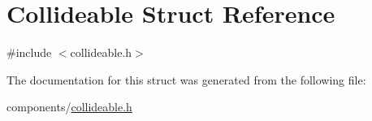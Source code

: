 \hypertarget{structCollideable}{}\section{Collideable Struct Reference}
\label{structCollideable}


{\ttfamily \#include $<$collideable.\+h$>$}



The documentation for this struct was generated from the following file\+:\begin{DoxyCompactItemize}
\item 
components/\hyperlink{collideable_8h}{collideable.\+h}\end{DoxyCompactItemize}
